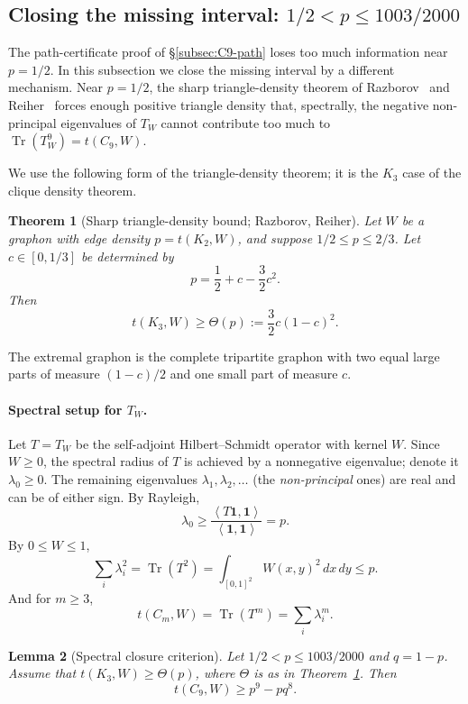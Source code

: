 \documentclass[11pt]{article}
\newtheorem{theorem}{Theorem}[section]
\newtheorem{lemma}[theorem]{Lemma}
\newcommand{\one}{\mathbf 1}
\newcommand{\ip}[2]{\left\langle #1,#2\right\rangle}
\newcommand{\Tr}{\operatorname{Tr}}
\begin{document}
\subsection{Closing the missing interval: $1/2<p\le1003/2000$}\label{subsec:C9-gap}

The path-certificate proof of \S\ref{subsec:C9-path} loses too much information near $p=1/2$.  In this subsection we close the missing interval by a different mechanism.  Near $p=1/2$, the sharp triangle-density theorem of Razborov~\cite{RazborovTriangles} and Reiher~\cite{ReiherCliqueDensity} forces enough positive triangle density that, spectrally, the negative non-principal eigenvalues of $T_W$ cannot contribute too much to $\Tr(T_W^9)=t(C_9,W)$.

We use the following form of the triangle-density theorem; it is the $K_3$ case of the clique density theorem.

\begin{theorem}[Sharp triangle-density bound; Razborov, Reiher]\label{thm:triangle-density}
Let $W$ be a graphon with edge density $p=t(K_2,W)$, and suppose $1/2\le p\le2/3$.  Let $c\in[0,1/3]$ be determined by
\[
        p=\frac12+c-\frac32c^2.
\]
Then
\[
        t(K_3,W)\ge \Theta(p):=\frac32 c(1-c)^2.
\]
\end{theorem}

The extremal graphon is the complete tripartite graphon with two equal large parts of measure $(1-c)/2$ and one small part of measure $c$.

\paragraph{Spectral setup for $T_W$.}
Let $T=T_W$ be the self-adjoint Hilbert--Schmidt operator with kernel $W$.  Since $W\ge0$, the spectral radius of $T$ is achieved by a nonnegative eigenvalue; denote it $\lambda_0\ge0$.  The remaining eigenvalues $\lambda_1,\lambda_2,\ldots$ (the \emph{non-principal} ones) are real and can be of either sign.  By Rayleigh,
\[
        \lambda_0
        \ge \frac{\ip{T\one}{\one}}{\ip{\one}{\one}}
        =p.
\]
By $0\le W\le1$,
\[
        \sum_i \lambda_i^2
        =\Tr(T^2)
        =\int_{[0,1]^2} W(x,y)^2\,dx\,dy
        \le p.
\]
And for $m\ge3$,
\[
        t(C_m,W)=\Tr(T^m)=\sum_i\lambda_i^m.
\]

\begin{lemma}[Spectral closure criterion]\label{lem:spectral-closure}
Let $1/2<p\le1003/2000$ and $q=1-p$.  Assume that $t(K_3,W)\ge \Theta(p)$, where $\Theta$ is as in Theorem~\ref{thm:triangle-density}.  Then
\[
        t(C_9,W)\ge p^9-pq^8.
\]
\end{lemma}
\end{document}
